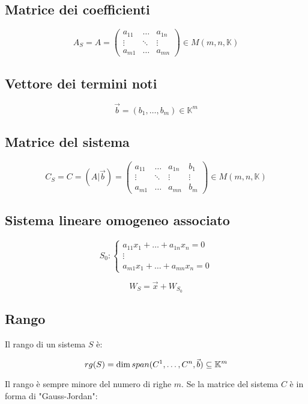 \documentclass{subfiles}
\begin{document}
\subsection{Matrice dei coefficienti}

$$
A_S = A =
\begin{pmatrix}
a_{11} & \dots & a_{1n}\\
\vdots & \ddots & \vdots\\
a_{m1} & \dots & a_{mn}
\end{pmatrix}
\in M(m,n,\mathbb{K})
$$

\subsection{Vettore dei termini noti}

$$
\vec{b} = (b_1, \dots, b_m) \in \mathbb{K}^m
$$

\subsection{Matrice del sistema}

$$
C_S = C = ( A | \vec{b} ) =
\begin{pmatrix}
a_{11} & \dots & a_{1n} & b_1\\
\vdots & \ddots & \vdots & \vdots\\
a_{m1} & \dots & a_{mn} & b_m
\end{pmatrix}
\in M(m,n,\mathbb{K})
$$

\subsection{Sistema lineare omogeneo associato}

$$
S_0: \begin{cases}
a_{11} x_1 + \dots + a_{1n} x_n = 0\\
\vdots\\
a_{m1} x_1 + \dots + a_{mn} x_n = 0
\end {cases}
$$

$$
W_S = \vec{x} + W_{S_0}
$$

\subsection{Rango}

Il rango di un sistema $S$ è:

$$
rg(S)= \dim \space span(C^1, \dots, C^n, \vec{b}) \subseteq \mathbb{K}^m
$$

\noindent
Il rango è sempre minore del numero di righe $m$.
Se la matrice del sistema $C$ è in forma di "Gauss-Jordan":
\end{document}
